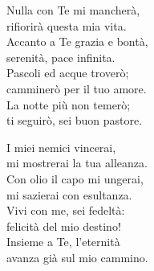 
\strofa Nulla con Te mi mancherà,\\
rifiorirà questa mia vita.\\
Accanto a Te grazia e bontà,\\
serenità, pace infinita.\\
Pascoli ed acque troverò;\\
camminerò per il tuo amore.\\
La notte più non temerò;\\
ti seguirò, sei buon pastore.

\spazio

\strofa I miei nemici vincerai,\\
mi mostrerai la tua alleanza.\\
Con olio il capo mi ungerai,\\
mi sazierai con esultanza.\\
Vivi con me, sei fedeltà:\\
felicità del mio destino!\\
Insieme a Te, l'eternità\\
avanza già sul mio cammino.